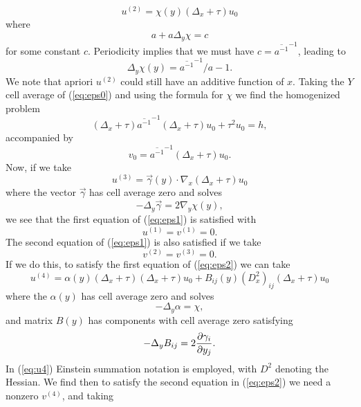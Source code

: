 \documentclass[12pt]{article}
\begin{document}
\begin{equation} \label{eq:u2} u^{(2)} = \chi(y) (\Delta_x +\tau ) u_0 \end{equation}
where $$a+ a\Delta_y \chi = c$$ for some constant $c$. Periodicity implies that we must have $c =  \overline{a^{-1}}^{-1}$, leading to  
\begin{equation}\label{eq:chi} \Delta_y \chi(y) = \overline{a^{-1}}^{-1}/a -1. \end{equation}
We note that apriori $u^{(2)}$ could still have an additive function of $x$.
Taking the $Y$ cell average of (\ref{eq:eps0}) and using the formula for $\chi$ we find the homogenized problem
  \begin{equation} \label{homog2}  (\Delta_x +\tau) \overline{a^{-1}}^{-1} (\Delta_x +\tau) u_0 +\tau^2 u_0= h , \end{equation}
  accompanied by 
  \begin{equation} \label{eq:v0} v_0 = \overline{a^{-1}}^{-1}(\Delta_x +\tau) u_0.\end{equation}
Now, if we take 
\begin{equation} \label{eq:u3} u^{(3)}= \vec{\gamma}(y)\cdot \nabla_x (\Delta_x +\tau) u_0  \end{equation}
where the vector $\vec{\gamma}$ has cell average zero and solves 
\begin{equation}\label{gammaeq} -\Delta_y \vec{\gamma}  =  2\nabla_y\chi(y) , \end{equation}
we see that the first equation of (\ref{eq:eps1}) is satisfied with $$u^{(1)}=v^{(1)}=0.$$ The second equation of (\ref{eq:eps1}) is also satisfied if we take $$v^{(2)}=v^{(3)}=0.$$ If we do this, to satisfy the first equation of (\ref{eq:eps2}) we can take 
\begin{equation} \label{eq:u4} u^{(4)}= \alpha(y) (\Delta_x +\tau)  (\Delta_x +\tau) u_0  + B_{ij}(y) (D^2_x)_{ij}  (\Delta_x +\tau) u_0\end{equation}
where the $\alpha(y)$ has cell average zero and solves 
\begin{equation}\label{alphaeq} -\Delta_y  \alpha  =  \chi , \end{equation}
and matrix $B(y)$ has components with cell average zero satisfying
\begin{equation} \label{Beq} -\Delta_y B_{ij} = 2{\partial\gamma_i\over{\partial y_j}}.\end{equation}
In (\ref{eq:u4}) Einstein summation notation is employed, with $D^2$ denoting the Hessian.  We find then to satisfy the second equation in (\ref{eq:eps2}) we need a nonzero $v^{(4)}$, and taking
\end{document}

